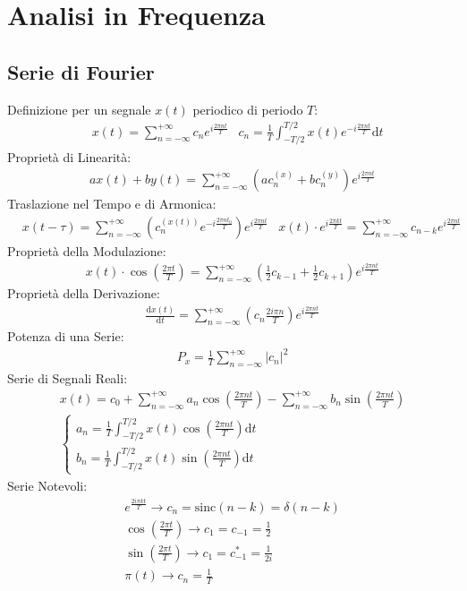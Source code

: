 \documentclass{article}
\newcommand{\sinc}{\mathrm{sinc}}
\newcommand{\df}{\mathrm{d}}
\newcommand{\suminf}{\displaystyle\sum_{n=-\infty}^{+\infty}}
\newcommand{\intp}{\displaystyle\frac{1}{T}\int_{-T/2}^{T/2}}
\begin{document}
\section{Analisi in Frequenza}

\subsection*{Serie di Fourier}
Definizione per un segnale $x(t)$ periodico di periodo $T$:
\begin{align*}
    &x(t)=\suminf c_ne^{i\frac{2\pi nt}{T}}
    &c_n=\intp x(t)e^{-i\frac{2\pi nt}{T}}\df t
\end{align*}
Proprietà di Linearità: 
\begin{gather*}
    ax(t)+by(t)=\suminf \left(ac_{n}^{(x)}+bc_{n}^{(y)}\right)e^{i\frac{2\pi nt}{T}}
\end{gather*}
Traslazione nel Tempo e di Armonica:
\begin{align*}
    &x(t-\tau)=\suminf \left(c_n^{(x(t))}e^{-i\frac{2\pi nt_0}{T}}\right)e^{i\frac{2\pi nt}{T}}
    &x(t)\cdot e^{i\frac{2\pi kt}{T}}=\suminf c_{n-k}e^{i\frac{2\pi nt}{T}}
\end{align*}
Proprietà della Modulazione:
\begin{gather*}
    x(t)\cdot\cos\left(\displaystyle\frac{2\pi t}{T}\right)=\suminf \left(\frac{1}{2}c_{k-1}+\frac{1}{2}c_{k+1}\right)e^{i\frac{2\pi nt}{T}}
\end{gather*}
Proprietà della Derivazione:
\begin{gather*}
    \displaystyle\frac{\df x(t)}{\df t}=\suminf \left(c_n\frac{2i\pi n}{T}\right)e^{i\frac{2\pi nt}{T}}
\end{gather*}
Potenza di una Serie:
\begin{gather*}
    P_x=\frac{1}{T}\suminf |c_n|^2
\end{gather*}
Serie di Segnali Reali:
\begin{gather*}
    x(t)=c_0+\suminf a_n\cos\left(\frac{2\pi nt}{T}\right)-\suminf b_n\sin\left(\frac{2\pi nt}{T}\right)\\
    \begin{cases}
        a_n=\intp x(t)\cos\left(\frac{2\pi nt}{T}\right)\df t\\
        b_n=\intp x(t)\sin\left(\frac{2\pi nt}{T}\right)\df t
    \end{cases}
\end{gather*}
Serie Notevoli:
\begin{gather*}
    e^{\frac{2i\pi kt}{T}}\to c_n=\sinc(n-k)=\delta(n-k)\\
    \cos\left(\displaystyle\frac{2\pi t}{T}\right)\to c_1=c_{-1}=\frac{1}{2}\\
    \sin\left(\displaystyle\frac{2\pi t}{T}\right)\to c_1=c_{-1}^*=\frac{1}{2i}\\
    \pi(t)\to c_n=\displaystyle\frac{1}{T}
\end{gather*}
\end{document}
